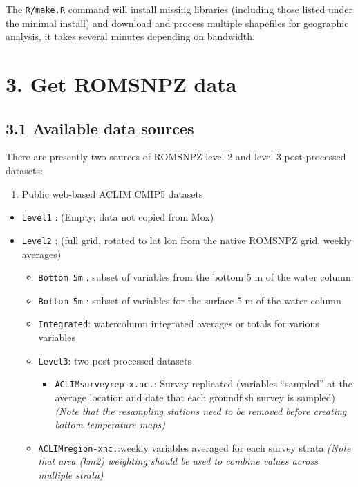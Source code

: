 \documentclass[
]{article}
\providecommand{\tightlist}{%
  \setlength{\itemsep}{0pt}\setlength{\parskip}{0pt}}
\begin{document}
The \texttt{R/make.R} command will install missing libraries (including
those listed under the minimal install) and download and process
multiple shapefiles for geographic analysis, it takes several minutes
depending on bandwidth.

\hypertarget{get-romsnpz-data}{%
\section{3. Get ROMSNPZ data}\label{get-romsnpz-data}}

\hypertarget{available-data-sources}{%
\subsection{3.1 Available data sources}\label{available-data-sources}}

There are presently two sources of ROMSNPZ level 2 and level 3
post-processed datasets:

\begin{enumerate}
\def\labelenumi{\arabic{enumi})}
\tightlist
\item
  Public web-based ACLIM CMIP5 datasets
\end{enumerate}

\begin{itemize}
\tightlist
\item
  \texttt{Level1} : (Empty; data not copied from Mox)
\item
  \texttt{Level2} : (full grid, rotated to lat lon from the native
  ROMSNPZ grid, weekly averages)

  \begin{itemize}
  \tightlist
  \item
    \texttt{Bottom\ 5m} : subset of variables from the bottom 5 m of the
    water column
  \item
    \texttt{Bottom\ 5m} : subset of variables for the surface 5 m of the
    water column
  \item
    \texttt{Integrated}: watercolumn integrated averages or totals for
    various variables
  \item
    \texttt{Level3}: two post-processed datasets

    \begin{itemize}
    \tightlist
    \item
      \texttt{ACLIMsurveyrep-x.nc.}: Survey replicated (variables
      ``sampled'' at the average location and date that each groundfish
      survey is sampled)\emph{(Note that the resampling stations need to
      be removed before creating bottom temperature maps)}\\
    \end{itemize}
  \item
    \texttt{ACLIMregion-xnc.}:weekly variables averaged for each survey
    strata \emph{(Note that area (km2) weighting should be used to
    combine values across multiple strata)}
  \end{itemize}
\end{itemize}
\end{document}
